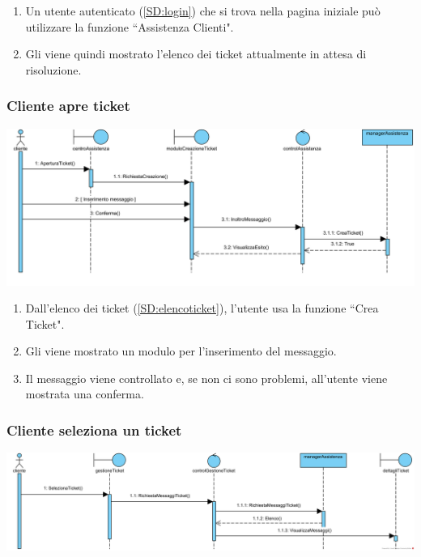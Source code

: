 \documentclass[12pt,a4paper]{article}
\begin{document}
\begin{enumerate}
\item Un utente autenticato (\ref{SD:login}) che si trova nella pagina iniziale può utilizzare la funzione ``Assistenza Clienti".
\item Gli viene quindi mostrato l'elenco dei ticket attualmente in attesa di risoluzione.
\end{enumerate}

\subsubsection{Cliente apre ticket}
\label{SD:aperturaticket}

\begin{center}
\includegraphics[trim={0 32cm 0 0},clip,width=\textwidth]{SequenceDiagram/ClienteCreaTicket}
\end{center}

\begin{enumerate}
\item Dall'elenco dei ticket (\ref{SD:elencoticket}), l'utente usa la funzione ``Crea Ticket".
\item Gli viene mostrato un modulo per l'inserimento del messaggio.
\item Il messaggio viene controllato e, se non ci sono problemi, all'utente viene mostrata una conferma.
\end{enumerate}

\subsubsection{Cliente seleziona un ticket}
\label{SD:selezioneticketcliente}

\begin{center}
\includegraphics[width=\textwidth]{SequenceDiagram/ClienteSelezionaTicket}
\end{center}
\end{document}
